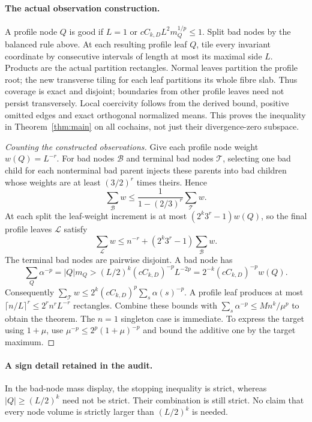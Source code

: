 \documentclass[11pt]{article}
\begin{document}
\paragraph{The actual observation construction.}
A profile node $Q$ is good if $L=1$ or $cC_{k,D}L^2m_Q^{1/p}\le1$. Split bad nodes by the balanced rule above. At each resulting profile leaf $Q$, tile every invariant coordinate by consecutive intervals of length at most its maximal side $L$. Products are the actual partition rectangles. Normal leaves partition the profile root; the new transverse tiling for each leaf partitions its whole fibre slab. Thus coverage is exact and disjoint; boundaries from other profile leaves need not persist transversely. Local coercivity follows from the derived bound, positive omitted edges and exact orthogonal normalized means. This proves the inequality in Theorem~\ref{thm:main} on all cochains, not just their divergence-zero subspace.

\begin{proof}[Counting the constructed observations]
Give each profile node weight $w(Q)=L^{-r}$. For bad nodes $\mathcal B$ and terminal bad nodes $\mathcal T$, selecting one bad child for each nonterminal bad parent injects these parents into bad children whose weights are at least $(3/2)^r$ times theirs. Hence
\[
 \sum_{\mathcal B}w\le\frac1{1-(2/3)^r}\sum_{\mathcal T}w.
\]
At each split the leaf-weight increment is at most $(2^k3^r-1)w(Q)$, so the final profile leaves $\mathcal L$ satisfy
\[
 \sum_{\mathcal L}w\le n^{-r}+(2^k3^r-1)\sum_{\mathcal B}w.
\]
The terminal bad nodes are pairwise disjoint. A bad node has
\[
 \sum_Q\alpha^{-p}=|Q|m_Q
 >(L/2)^k(cC_{k,D})^{-p}L^{-2p}
 =2^{-k}(cC_{k,D})^{-p}w(Q).
\]
Consequently $\sum_{\mathcal T}w\le2^k(cC_{k,D})^p\sum_s\alpha(s)^{-p}$.
A profile leaf produces at most $\lceil n/L\rceil^r\le2^r n^r L^{-r}$ rectangles. Combine these bounds with
$\sum_s\alpha^{-p}\le M n^k/\mu^p$ to obtain the theorem. The $n=1$ singleton case is immediate. To express the target using $1+\mu$, use $\mu^{-p}\le2^p(1+\mu)^{-p}$ and bound the additive one by the target maximum.
\end{proof}

\paragraph{A sign detail retained in the audit.}
In the bad-node mass display, the stopping inequality is strict, whereas $|Q|\ge(L/2)^k$ need not be strict. Their combination is still strict. No claim that every node volume is strictly larger than $(L/2)^k$ is needed.
\end{document}
